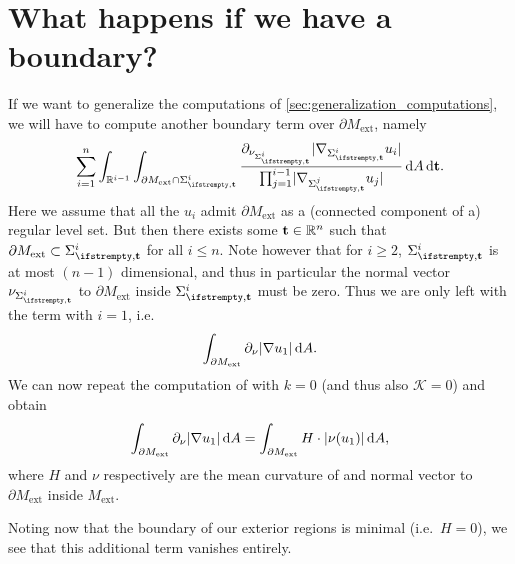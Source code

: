 \documentclass[draft]{amsart}
\newcommand*{\mathcomma}{,}
\newcommand*{\mathfullstop}{.}
\newcommand*{\reals}{\mathbb{R}}
\newcommand*{\boundary}{\partial}
\DeclarePairedDelimiter{\abs}{\lvert}{\rvert} %
\newcommand{\ext}{\mathrm{ext}} %
\begin{document}
\section{What happens if we have a boundary?}\label{sec:exterior_boundary_higher_dimension}
If we want to generalize the computations of \cref{sec:generalization_computations}, we will have to compute another boundary term over \( \boundary{M_{\ext}} \), namely
\begin{equation*}
    \sum_{i=1}^{n}\int_{\reals^{i-1}}\int_{\boundary{M_{\ext}}\cap \nls^i}\frac{\partial_{\nu_{\nls^i}}\abs{\nabla_{\nls^i}u_i}}{\prod_{j=1}^{i-1}\abs{\nabla_{\nls^j} u_j}}\odif{A}\odif{\vect{t}}\mathfullstop
\end{equation*}
Here we assume that all the \( u_i \) admit \( \boundary{M_{\ext}} \) as a (connected component of a) regular level set. But then there exists some \( \vect{t}\in \reals^n \) such that \( \boundary{M_{\ext}}\subset \nls^i \) for all \( i\leq n \). Note however that for \( i\geq 2 \), \( \nls^i \) is at most \( (n-1) \) dimensional, and thus in particular the normal vector \( \nu_{\nls^i} \) to \( \boundary{M_{\ext}} \) inside \( \nls^i \) must be zero. Thus we are only left with the term with \( i=1 \), i.e.
\begin{equation*}
    \int_{\boundary{M_{\ext}}}\partial_{\nu}\abs{\nabla u_1}\odif{A}.
\end{equation*} 
We can now repeat the computation of \cite[Section 6.2]{hirschSpacetimeHarmonicFunctions2021} with \( k=0 \) (and thus also \( \mathcal{K}=0 \)) and obtain
\begin{equation*}
    \int_{\boundary{M_{\ext}}}\partial_{\nu}\abs{\nabla u_1}\odif{A}=\int_{\boundary{M_{\ext}}}H\cdot \abs{\nu(u_1)}\odif{A},
\end{equation*}
where \( H \) and \( \nu \) respectively are the mean curvature of and normal vector to \( \boundary{M_{\ext}} \) inside \( M_{\ext} \).

Noting now that the boundary of our exterior regions is minimal (i.e.~\( H=0 \)), we see that this additional term vanishes entirely.


\endgroup

\printbibliography
\end{document}
